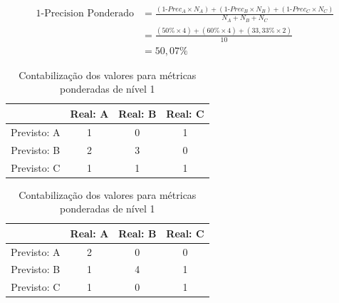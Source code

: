 \begin{align*}
\text{1-Precision Ponderado} &= \frac{(\text{1-$Prec_A$} \times N_A)+(\text{1-$Prec_B$} \times N_B)+(\text{1-$Prec_C$} \times N_C)}{N_A+N_B+N_C} \\
&= \frac{(50\% \times 4)+(60\% \times 4)+(33,33\% \times 2)}{10} \\
&= 50,07\%
\end{align*}

\begin{table}[h!]
  \begin{center}
    \begin{tabular}{cccc}
      \hline
         & \textbf{Real: A} & \textbf{Real: B} & \textbf{Real: C} \\
      \hline

      Previsto: A & 1 & 0 & 1\\
      Previsto: B & 2 & 3 & 0\\
      Previsto: C & 1 & 1 & 1\\

      \hline
    \end{tabular}
    \caption{Contabilização dos valores para métricas ponderadas de nível 1}
    \label{tab:confusao1}
  \end{center}
\end{table}

\begin{table}[h!]
  \begin{center}
    \begin{tabular}{cccc}
      \hline
         & \textbf{Real: A} & \textbf{Real: B} & \textbf{Real: C} \\
      \hline

      Previsto: A & 2 & 0 & 0\\
      Previsto: B & 1 & 4 & 1\\
      Previsto: C & 1 & 0 & 1\\

      \hline
    \end{tabular}
    \caption{Contabilização dos valores para métricas ponderadas de nível 1}
    \label{tab:confusao2}
  \end{center}
\end{table}

